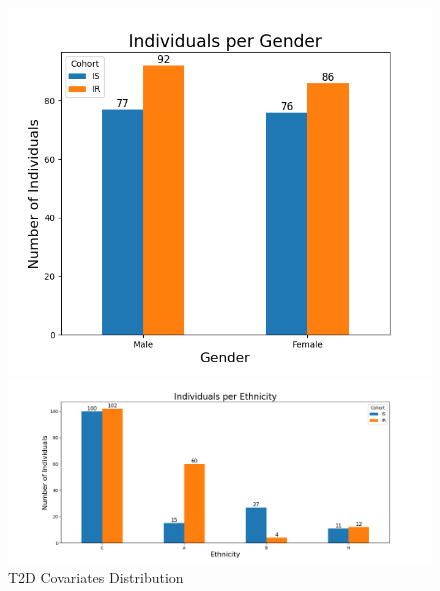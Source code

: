 \documentclass[12pt,letterpaper]{article}
\begin{document}
\begin{figure}[h!]
\begin{minipage}{0.34\linewidth}
  \centering
  \includegraphics[width=\linewidth]{../plots/t2d/Gender_bar_chart.png}
\end{minipage}%
\begin{minipage}{0.66\linewidth}
   \centering
   \includegraphics[width=\linewidth]{../plots/t2d/Ethnicity_bar_chart.png}
\end{minipage}
\caption{T2D Covariates Distribution}
\label{fig:t2dcovariates}
\end{figure}
\end{document}
